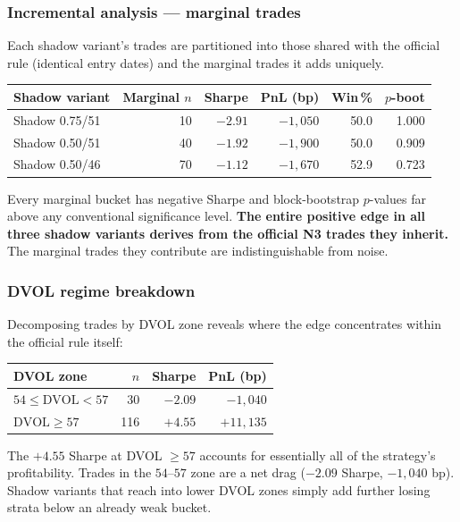 \documentclass[12pt, a4paper]{article}
\theoremstyle{definition}
\begin{document}
\subsubsection*{Incremental analysis --- marginal trades}

Each shadow variant's trades are partitioned into those shared with the official
rule (identical entry dates) and the marginal trades it adds uniquely.

\begin{center}
\begin{tabular}{lrrrrr}
\toprule
Shadow variant & Marginal $n$ & Sharpe & PnL (bp) & Win\,\% & $p$-boot \\
\midrule
Shadow 0.75/51 & 10 & $-2.91$ & $-1{,}050$ & 50.0 & 1.000 \\
Shadow 0.50/51 & 40 & $-1.92$ & $-1{,}900$ & 50.0 & 0.909 \\
Shadow 0.50/46 & 70 & $-1.12$ & $-1{,}670$ & 52.9 & 0.723 \\
\bottomrule
\end{tabular}
\end{center}

Every marginal bucket has negative Sharpe and block-bootstrap $p$-values
far above any conventional significance level.  \textbf{The entire positive
edge in all three shadow variants derives from the official N3 trades they
inherit.}  The marginal trades they contribute are indistinguishable from noise.

\subsubsection*{DVOL regime breakdown}

Decomposing trades by DVOL zone reveals where the edge concentrates within the
official rule itself:

\begin{center}
\begin{tabular}{lrrr}
\toprule
DVOL zone & $n$ & Sharpe & PnL (bp) \\
\midrule
$54 \leq \mathrm{DVOL} < 57$ & 30 & $-2.09$ & $-1{,}040$ \\
$\mathrm{DVOL} \geq 57$      & 116 & $+4.55$ & $+11{,}135$ \\
\bottomrule
\end{tabular}
\end{center}

The $+4.55$ Sharpe at DVOL $\geq 57$ accounts for essentially all of the
strategy's profitability.  Trades in the $54$--$57$ zone are a net drag
($-2.09$ Sharpe, $-1{,}040$ bp).  Shadow variants that reach into lower DVOL
zones simply add further losing strata below an already weak bucket.
\end{document}
